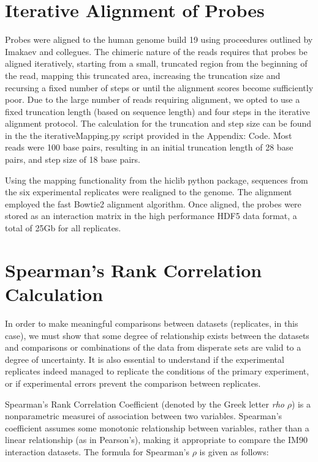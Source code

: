 \documentclass[phd,tocprelim]{cornell}
\begin{document}
%
%

\appendix
\appendixpage
\addappheadtotoc
\chapter{Iterative Alignment of Probes}

Probes were aligned to the human genome build 19 using proceedures outlined by
Imakaev and collegues\cite{imakaev2013}.  The chimeric nature of the reads
requires that probes be aligned iteratively, starting from a small, truncated
region from the beginning of the read, mapping this truncated area, increasing
the truncation size and recursing a fixed number of steps or until the alignment
scores become sufficiently poor.  Due to the large number of reads requiring
alignment, we opted to use a fixed truncation length (based on sequence length)
and four steps in the iterative alignment protocol.  The calculation
for the truncation and step size can be found in the the iterativeMapping.py
script provided in the Appendix: Code.  Most reads were 100 base pairs, resulting
in an initial truncation length of 28 base pairs, and step size of 18 base pairs.

Using the mapping functionality from the hiclib python package\cite{imakaev2013},
sequences from the six experimental replicates were realigned to the genome.  The
alignment employed the fast Bowtie2 alignment algorithm\cite{Langmead2012}.  Once
aligned, the probes were stored as an interaction matrix in the high performance
HDF5\cite{hdf5} data format, a total of 25Gb for all replicates.


\chapter{Spearman's Rank Correlation Calculation}

In order to make meaningful comparisons between datasets (replicates,
in this case), we must show that some degree of relationship exists between
the datasets and comparisons or combinations of the data from disperate sets
are valid to a degree of uncertainty.  It is also essential to understand if the
experimental replicates indeed managed to replicate the conditions of the primary
experiment, or if experimental errors prevent the comparison between replicates.

Spearman's Rank Correlation Coefficient (denoted by the Greek letter \textit{rho}
$\rho$) is a nonparametric measurei of association between two variables.
Spearman's coefficient assumes some monotonic relationship between variables,
rather than a linear relationship (as in Pearson's), making it appropriate
to compare the IM90 interaction datasets.  The formula for Spearman's $\rho$ is
given as follows:
\end{document}
